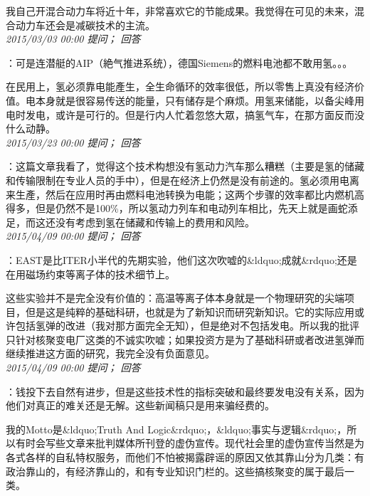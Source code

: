 \documentclass[twocolumn]{ctexart}
\begin{document}
我自己开混合动力车将近十年，非常喜欢它的节能成果。我觉得在可见的未来，混合动力车还会是减碳技术的主流。\\

\textit{\hfill\noindent\small 2015/03/03 00:00 提问； 回答}

：可是连潜艇的AIP（絶气推进系统），德国Siemens的燃料电池都不敢用氢。。。

在民用上，氢必须靠电能產生，全生命循环的效率很低，所以零售上真没有经济价值。电本身就是很容易传送的能量，只有储存是个麻烦。用氢来储能，以备尖峰用电时发电，或许是可行的。但是行内人忙着忽悠大眾，搞氢气车，在那方面反而没什么动静。\\

\textit{\hfill\noindent\small 2015/03/23 00:00 提问； 回答}

：这篇文章我看了，觉得这个技术构想没有氢动力汽车那么糟糕（主要是氢的储藏和传输限制在专业人员的手中），但是在经济上仍然是没有前途的。氢必须用电离来生產，然后在应用时再由燃料电池转换为电能；这两个步骤的效率都比内燃机高得多，但是仍然不是100\%，所以氢动力列车和电动列车相比，先天上就是画蛇添足，而这还没有考虑到氢在储藏和传输上的费用和风险。\\

\textit{\hfill\noindent\small 2015/04/09 00:00 提问； 回答}

：EAST是比ITER小半代的先期实验，他们这次吹嘘的\&ldquo;成就\&rdquo;还是在用磁场约束等离子体的技术细节上。

这些实验并不是完全没有价值的：高温等离子体本身就是一个物理研究的尖端项目，但是这是纯粹的基础科研，也就是为了新知识而研究新知识。它的实际应用或许包括氢弹的改进（我对那方面完全无知），但是绝对不包括发电。所以我的批评只针对核聚变电厂这类的不诚实吹嘘；如果投资方是为了基础科研或者改进氢弹而继续推进这方面的研究，我完全没有负面意见。\\

\textit{\hfill\noindent\small 2015/04/09 00:00 提问； 回答}

：钱投下去自然有进步，但是这些技术性的指标突破和最终要发电没有关系，因为他们对真正的难关还是无解。这些新闻稿只是用来骗经费的。

我的Motto是\&ldquo;Truth And Logic\&rdquo;，\&ldquo;事实与逻辑\&rdquo;，所以有时会写些文章来批判媒体所刊登的虚伪宣传。现代社会里的虚伪宣传当然是为各式各样的自私特权服务，而他们不怕被揭露辟谣的原因又依其靠山分为几类：有政治靠山的，有经济靠山的，和有专业知识门栏的。这些搞核聚变的属于最后一类。\\
\end{document}
